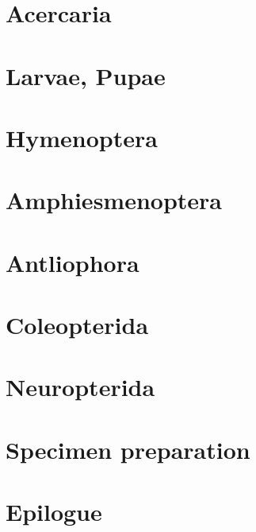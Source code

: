 \documentclass[11pt]{book}
\begin{document}
\chapter{Acercaria}


\chapter{Larvae, Pupae}


\chapter{Hymenoptera}


\chapter{Amphiesmenoptera}


\chapter{Antliophora}


\chapter{Coleopterida}


\chapter{Neuropterida}


\chapter{Specimen preparation}


\chapter{Epilogue}


\backmatter




\printindex%
\end{document}
